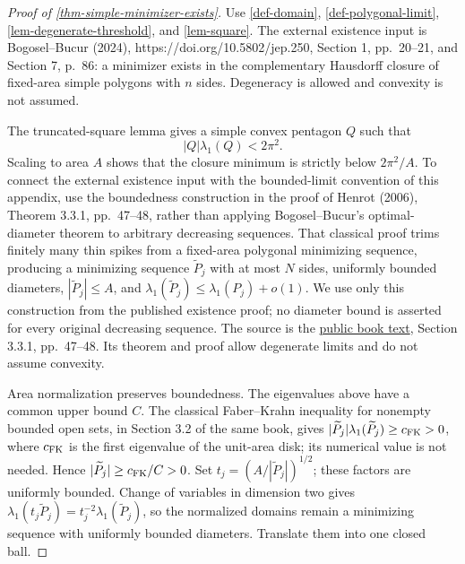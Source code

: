 \documentclass[11pt,a4paper]{article}
\theoremstyle{proofmanuscript}
\begin{document}
\begin{proof}[Proof of \ref{thm-simple-minimizer-exists}]

Use \ref{def-domain}, \ref{def-polygonal-limit}, \ref{lem-degenerate-threshold}, and \ref{lem-square}. The external existence input is Bogosel--Bucur (2024), https://doi.org/10.5802/jep.250, Section 1, pp.~20--21, and Section 7, p.~86: a minimizer exists in the complementary Hausdorff closure of fixed-area simple polygons with \(n\) sides. Degeneracy is allowed and convexity is not assumed.

The truncated-square lemma gives a simple convex pentagon \(Q\) such that \[
|Q|\lambda_1(Q)<2\pi^2.
\] Scaling to area \(A\) shows that the closure minimum is strictly below \(2\pi^2/A\). To connect the external existence input with the bounded-limit convention of this appendix, use the boundedness construction in the proof of Henrot (2006), Theorem 3.3.1, pp.~47--48, rather than applying Bogosel--Bucur's optimal-diameter theorem to arbitrary decreasing sequences. That classical proof trims finitely many thin spikes from a fixed-area polygonal minimizing sequence, producing a minimizing sequence \(\widetilde P_j\) with at most \(N\) sides, uniformly bounded diameters, \(|\widetilde P_j|\le A\), and \(\lambda_1(\widetilde P_j)\le\lambda_1(P_j)+o(1)\). We use only this construction from the published existence proof; no diameter bound is asserted for every original decreasing sequence. The source is the \href{https://ndl.ethernet.edu.et/bitstreams/902d1f87-86bf-4004-bcc9-4091b345cb09/download}{public book text}, Section 3.3.1, pp.~47--48. Its theorem and proof allow degenerate limits and do not assume convexity.

Area normalization preserves boundedness. The eigenvalues above have a common upper bound \(C\). The classical Faber--Krahn inequality for nonempty bounded open sets, in Section 3.2 of the same book, gives \(|\widetilde P_j|\lambda_1(\widetilde P_j)\ge c_{\rm FK}>0\), where \(c_{\rm FK}\) is the first eigenvalue of the unit-area disk; its numerical value is not needed. Hence \(|\widetilde P_j|\ge c_{\rm FK}/C>0\). Set \(t_j=(A/|\widetilde P_j|)^{1/2}\); these factors are uniformly bounded. Change of variables in dimension two gives \(\lambda_1(t_j\widetilde P_j)=t_j^{-2}\lambda_1(\widetilde P_j)\), so the normalized domains remain a minimizing sequence with uniformly bounded diameters. Translate them into one closed ball.


\end{proof}
\end{document}
